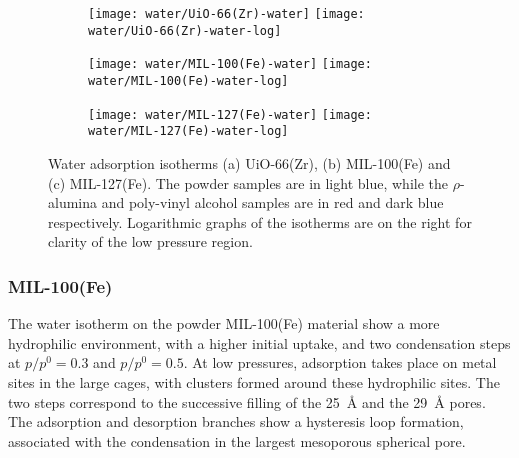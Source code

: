 \begin{figure}[p!]
    \centering

    \begin{subfigure}{\linewidth}
        \centering
        \parbox{0.1\linewidth}{\caption{}\label{shaping:fgr:wateruio66}}%
        \texttt{[image: water/UiO-66(Zr)-water]}%
        \texttt{[image: water/UiO-66(Zr)-water-log]}%
    \end{subfigure}%

    \begin{subfigure}{\linewidth}
        \centering
        \parbox{0.1\linewidth}{\caption{}\label{shaping:fgr:watermil100}}%
        \texttt{[image: water/MIL-100(Fe)-water]}%
        \texttt{[image: water/MIL-100(Fe)-water-log]}%
    \end{subfigure}%

    \begin{subfigure}{\linewidth}
        \centering
        \parbox{0.1\linewidth}{\caption{}\label{shaping:fgr:watermil127}}%
        \texttt{[image: water/MIL-127(Fe)-water]}%
        \texttt{[image: water/MIL-127(Fe)-water-log]}%
    \end{subfigure}%
    
    \caption{Water adsorption isotherms (a) UiO-66(Zr), 
    (b) MIL-100(Fe) and (c) MIL-127(Fe). The powder samples are in light
    blue, while the \(\rho\)-alumina and poly-vinyl alcohol samples are in red
    and dark blue respectively. Logarithmic graphs of the isotherms are
    on the right for clarity of the low
    pressure region.}%
    \label{shaping:fgr:wateradsorption}
\end{figure}

\subsubsection{MIL-100(Fe)}

The water isotherm on the powder MIL-100(Fe) material show a more 
hydrophilic environment, with a higher initial uptake, and two 
condensation steps at \(p/p^0 = 0.3\) and \(p/p^0 = 0.5\).
At low pressures, adsorption takes place on metal sites in the 
large cages, with clusters formed around these hydrophilic
sites. The two steps correspond to the successive filling of the 
\SI{25}{\angstrom} and the \SI{29}{\angstrom} pores. The
adsorption and desorption branches show a hysteresis loop 
formation, associated with the condensation in the largest 
mesoporous spherical pore.

